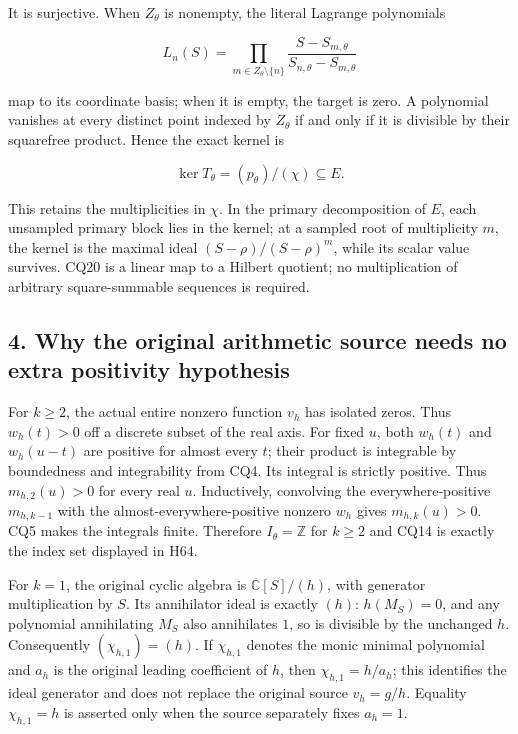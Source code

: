 \documentclass{article}
\begin{document}
It is surjective. When \(Z_\theta\) is nonempty, the literal Lagrange polynomials

\[
L_n(S)=\prod_{m\in Z_\theta\setminus\{n\}}
\frac{S-S_{m,\theta}}{S_{n,\theta}-S_{m,\theta}}
\tag{CQ21}
\]

map to its coordinate basis; when it is empty, the target is zero. A polynomial vanishes at every distinct point indexed by \(Z_\theta\) if and only if it is divisible by their squarefree product. Hence the exact kernel is

\[
\ker T_\theta=(p_\theta)/(\chi)\subseteq E.
\tag{CQ22}
\]

This retains the multiplicities in \(\chi\). In the primary decomposition of \(E\), each unsampled primary block lies in the kernel; at a sampled root of multiplicity \(m\), the kernel is the maximal ideal \((S-\rho)/(S-\rho)^m\), while its scalar value survives. CQ20 is a linear map to a Hilbert quotient; no multiplication of arbitrary square-summable sequences is required.

\subsection{4. Why the original arithmetic source needs no extra positivity hypothesis}\label{why-the-original-arithmetic-source-needs-no-extra-positivity-hypothesis}

For \(k \ge 2\), the actual entire nonzero function \(v_h\) has isolated zeros. Thus \(w_h(t)>0\) off a discrete subset of the real axis. For fixed \(u\), both \(w_h(t)\) and \(w_h(u-t)\) are positive for almost every \(t\); their product is integrable by boundedness and integrability from CQ4. Its integral is strictly positive. Thus \(m_{h,2}(u)>0\) for every real \(u\). Inductively, convolving the everywhere-positive \(m_{h,k-1}\) with the almost-everywhere-positive nonzero \(w_h\) gives \(m_{h,k}(u)>0\). CQ5 makes the integrals finite. Therefore \(I_\theta=\mathbb Z\) for \(k \ge 2\) and CQ14 is exactly the index set displayed in H64.

For \(k=1\), the original cyclic algebra is \(\mathbb C[S]/(h)\), with generator multiplication by \(S\). Its annihilator ideal is exactly \((h)\): \(h(M_S)=0\), and any polynomial annihilating \(M_S\) also annihilates \(1\), so is divisible by the unchanged \(h\). Consequently \((\chi_{h,1})=(h)\). If \(\chi_{h,1}\) denotes the monic minimal polynomial and \(a_h\) is the original leading coefficient of \(h\), then \(\chi_{h,1}=h/a_h\); this identifies the ideal generator and does not replace the original source \(v_h=g/h\). Equality \(\chi_{h,1}=h\) is asserted only when the source separately fixes \(a_h=1\).
\end{document}
